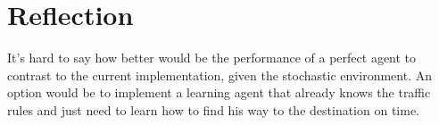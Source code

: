 \documentclass[a4paper]{article}
\begin{document}

\section{Reflection}
\label{sec:reflection}
It's hard to say how better would be the performance of a perfect agent to contrast to the current implementation, given the stochastic environment. An option would be to implement a learning agent that already knows the traffic rules and just need to learn how to find his way to the destination on time.






\end{document}
